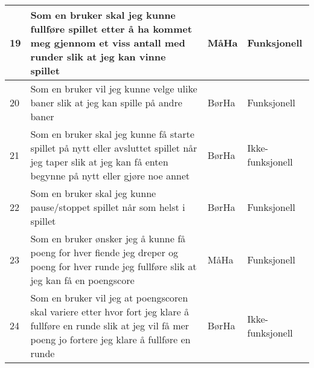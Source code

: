\documentclass[norsk,a4paper,fontsize=11]{article}
\begin{document}
\begin{center}
\begin{tabular}{|m{} | m{} | m{2cm} | m{3cm} |}
    19 & Som en bruker skal jeg kunne fullføre spillet etter å ha kommet meg gjennom et viss antall med runder slik at jeg kan vinne spillet & MåHa & Funksjonell \\ \hline
    
    20 & Som en bruker vil jeg kunne velge ulike baner slik at jeg kan spille på andre baner & BørHa & Funksjonell \\ \hline
    
    21 & Som en bruker skal jeg kunne få starte spillet på nytt eller avsluttet spillet når jeg taper slik at jeg kan få enten begynne på nytt eller gjøre noe annet  & BørHa & Ikke-funksjonell \\ \hline
       
   22 & Som en bruker skal jeg kunne pause/stoppet spillet når som helst i spillet & BørHa & Funksjonell \\ \hline
   
   23 & Som en bruker ønsker jeg å kunne få poeng for hver fiende jeg dreper og poeng for hver runde jeg fullføre slik at jeg kan få en poengscore  & MåHa & Funksjonell 
   \\ \hline
   
   24 & Som en bruker vil jeg at poengscoren skal variere etter hvor fort jeg klare å fullføre en runde slik at jeg vil få mer poeng jo fortere jeg klare å fullføre en runde & BørHa & Ikke-funksjonell \\ \hline 
    
\end{tabular}
\end{center} 
\end{document}
